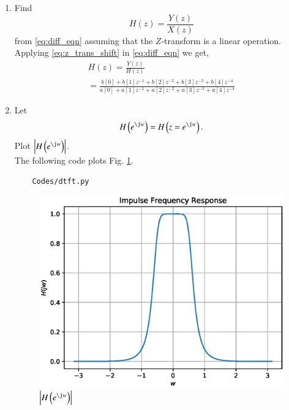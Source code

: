 \documentclass[journal,12pt,twocolumn]{IEEEtran}
\renewcommand\thesection{\arabic{section}}
\begin{document}
\begin{enumerate}[label=\thesection.\arabic*,ref=\thesection.\theenumi]
\item Find
%
\begin{equation}
H(z) = \frac{Y(z)}{X(z)}
\end{equation}
%
from  \eqref{eq:diff_eqn} assuming that the $Z$-transform is a linear operation.
\\
\solution  Applying \eqref{eq:z_trans_shift} in \eqref{eq:diff_eqn} we get,
\begin{equation}
\begin{split}
H(z) = \frac{Y(z)}{H(z)}                
\\
=\frac{b[0]+b[1]z^{-1}+b[2]z^{-2}+b[3]z^{-3}+b[4]z^{-4}}{a[0]+a[1]z^{-1}+a[2]z^{-2}+a[3]z^{-3}+a[4]z^{-4}}
\label{eq:freq_resp}
\end{split}
\end{equation}
%
\item 
Let
\begin{equation}
H\brak{e^{\j w}} = H\brak{z = e^{\j w}}.
\end{equation}
Plot $\abs{H\brak{e^{\j w}}}$.
\\
\solution
The following code plots Fig. \ref{fig:H(jw)}.
\begin{lstlisting}
    Codes/dtft.py
\end{lstlisting}
\begin{figure}[!ht]
\centering
\includegraphics[width=\columnwidth]{./figs/H(jw)}
\caption{$\abs{H\brak{e^{\j w}}}$}
\label{fig:H(jw)}
\end{figure}

\end{enumerate}
\end{document}
